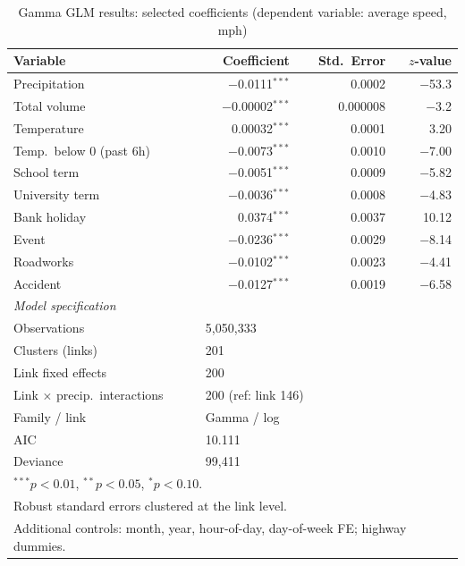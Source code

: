 \documentclass[review,authoryear]{elsarticle}
\begin{document}
\begin{table}[H]
\centering
\caption{Gamma GLM results: selected coefficients (dependent variable: average speed, \si{mph})}
\label{tab:glm}
\begin{tabular}{lrrr}
\toprule
Variable & Coefficient & Std.\ Error & $z$-value \\
\midrule
Precipitation & $-$0.0111$^{***}$ & 0.0002 & $-$53.3 \\
Total volume & $-$0.00002$^{***}$ & 0.000008 & $-$3.2 \\
Temperature & 0.00032$^{***}$ & 0.0001 & 3.20 \\
Temp.\ below 0 (past 6h) & $-$0.0073$^{***}$ & 0.0010 & $-$7.00 \\
School term & $-$0.0051$^{***}$ & 0.0009 & $-$5.82 \\
University term & $-$0.0036$^{***}$ & 0.0008 & $-$4.83 \\
Bank holiday & 0.0374$^{***}$ & 0.0037 & 10.12 \\
Event & $-$0.0236$^{***}$ & 0.0029 & $-$8.14 \\
Roadworks & $-$0.0102$^{***}$ & 0.0023 & $-$4.41 \\
Accident & $-$0.0127$^{***}$ & 0.0019 & $-$6.58 \\
\midrule
\multicolumn{4}{l}{\textit{Model specification}} \\
Observations & \multicolumn{3}{l}{5{,}050{,}333} \\
Clusters (links) & \multicolumn{3}{l}{201} \\
Link fixed effects & \multicolumn{3}{l}{200} \\
Link $\times$ precip.\ interactions & \multicolumn{3}{l}{200 (ref: link 146)} \\
Family / link & \multicolumn{3}{l}{Gamma / log} \\
AIC & \multicolumn{3}{l}{10.111} \\
Deviance & \multicolumn{3}{l}{99{,}411} \\
\bottomrule
\multicolumn{4}{l}{\footnotesize $^{***}p < 0.01$, $^{**}p < 0.05$, $^{*}p < 0.10$.} \\
\multicolumn{4}{l}{\footnotesize Robust standard errors clustered at the link level.} \\
\multicolumn{4}{l}{\footnotesize Additional controls: month, year, hour-of-day, day-of-week FE; highway dummies.} \\
\end{tabular}
\end{table}
\end{document}
